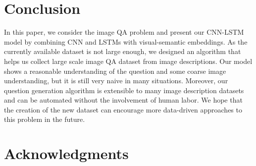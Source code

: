 \documentclass{article}
\renewcommand{\#}[1]{\textbf{#1}}
\begin{document}
\section{Conclusion}
In this paper, we consider the image QA problem and present our CNN-LSTM model by combining CNN and LSTMs with visual-semantic embeddings. As the currently available dataset is not large enough, we designed an algorithm that helps us collect large scale image QA dataset from image descriptions. Our model shows a reasonable understanding of the question and some coarse image understanding, but it is still very naive in many situations. Moreover, our question generation algorithm is extensible to many image description datasets and can be automated without the involvement of human labor. We hope that the creation of the new dataset can encourage more data-driven approaches to this problem in the future.

\section*{Acknowledgments}



\end{document}
